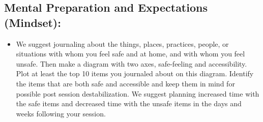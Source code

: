 \documentclass[12pt,letterpaper]{book}
\begin{document}
\subsection*{Mental Preparation and Expectations (Mindset):}
\begin{itemize}
    \label{safetymapping}
    \item We suggest journaling about the things, places, practices, people, or situations with whom you feel safe and at home, and with whom you feel unsafe. Then make a diagram with two axes, safe-feeling and accessibility. Plot at least the top 10 items you journaled about on this diagram. Identify the items that are both safe and accessible and keep them in mind for possible post session destabilization. We suggest planning increased time with the safe items and decreased time with the unsafe items in the days and weeks following your session.
    \label{habitMapping}

\end{itemize}
\end{document}
